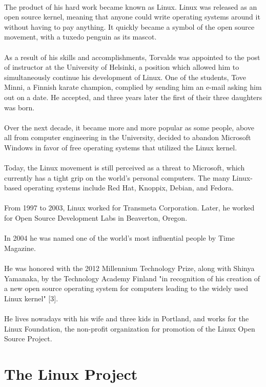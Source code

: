\documentclass[11pt]{article}
\begin{document}
\\
The product of his hard work became known as Linux.
Linux was released as an open source kernel, meaning that anyone could write operating systems around it without having to pay anything. It quickly became a symbol of the open source movement, with a tuxedo penguin as its mascot.\\
\\
As a result of his skills and accomplishments, Torvalds was appointed to the post of instructor at the University of Helsinki, a position which allowed him to simultaneously continue his development of Linux. One of the students, Tove Minni, a Finnish karate champion, complied by sending him an e-mail asking him out on a date. He accepted, and three years later the first of their three daughters was born.\\
\\
Over the next decade, it became more and more popular as some people, above all from computer engineering in the University, decided to abandon Microsoft Windows in favor of free operating systems that utilized the Linux kernel.\\
\\
Today, the Linux movement is still perceived as a threat to Microsoft, which currently has a tight grip on the world's personal computers. The many Linux-based operating systems include Red Hat, Knoppix, Debian, and Fedora.\\
\\
From 1997 to 2003, Linux worked for Transmeta Corporation. Later, he worked for Open Source Development Labs in Beaverton, Oregon.\\
\\
In 2004 he was named one of the world's most influential people by Time Magazine.\\
\\
He was honored with the 2012 Millennium Technology Prize, along with Shinya Yamanaka, by the Technology Academy Finland "in recognition of his creation of a new open source operating system for computers leading to the widely used Linux kernel" [3].\\
\\
He lives nowadays with his wife and three kids in Portland, and works for the Linux Foundation, the non-profit organization for promotion of the Linux Open Source Project.

\pagebreak

\section{The Linux Project}
\end{document}
